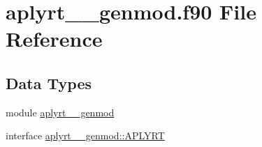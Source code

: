 \hypertarget{aplyrt____genmod_8f90}{\section{aplyrt\+\_\+\+\_\+genmod.\+f90 File Reference}
\label{aplyrt____genmod_8f90}
}
\subsection*{Data Types}
\begin{DoxyCompactItemize}
\item 
module \hyperlink{classaplyrt____genmod}{aplyrt\+\_\+\+\_\+genmod}
\item 
interface \hyperlink{interfaceaplyrt____genmod_1_1APLYRT}{aplyrt\+\_\+\+\_\+genmod\+::\+A\+P\+L\+Y\+R\+T}
\end{DoxyCompactItemize}

